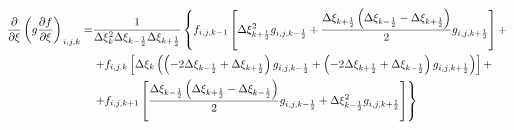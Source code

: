 \begin{equation*}
    \begin{split}
        \left.
            \frac
                {\partial}
                {\partial \xi}
            \left(
                g
                \frac
                    {\partial f}
                    {\partial \xi}
            \right)
        \right._{i, j, k}
        = &
        \frac
            {1}
            {
                \Delta \xi^2_{k}
                \Delta \xi_{k - \frac{1}{2}}
                \Delta \xi_{k + \frac{1}{2}}
            }
        \left\{
            f_{i, j, k - 1}
            \left[
                \Delta \xi^2_{k+\frac{1}{2}}
                g_{i, j, k-\frac{1}{2}}
                +
                \frac
                    {
                        \Delta \xi_{k + \frac{1}{2}}
                        \left(
                            \Delta \xi_{k - \frac{1}{2}}
                            -
                            \Delta \xi_{k + \frac{1}{2}}
                        \right)
                    }
                    {2}
                g_{i, j, k+\frac{1}{2}}
            \right]
            +
        \right.
        \\ &
        \left.
            +
            f_{i, j, k}
            \left[
                \Delta \xi_{k}
                \left(
                    \left(
                        -
                        2
                        \Delta \xi_{k-\frac{1}{2}}
                        +
                        \Delta \xi_{k+\frac{1}{2}}
                    \right)
                    g_{i, j, k-\frac{1}{2}}
                    +
                    \left(
                        -
                        2
                        \Delta \xi_{k+\frac{1}{2}}
                        +
                        \Delta \xi_{k-\frac{1}{2}}
                    \right)
                    g_{i, j, k+\frac{1}{2}}
                \right)
            \right]
            +
        \right.
        \\ &
        \left.
            +
            f_{i, j, k + 1}
            \left[
                \frac
                    {
                        \Delta \xi_{k - \frac{1}{2}}
                        \left(
                            \Delta \xi_{k + \frac{1}{2}}
                            -
                            \Delta \xi_{k - \frac{1}{2}}
                        \right)
                    }
                    {2}
                g_{i, j, k - \frac{1}{2}}
                +
                \Delta \xi^2_{k - \frac{1}{2}}
                g_{i, j, k + \frac{1}{2}}
            \right]
        \right\}
    \end{split}
\end{equation*}

